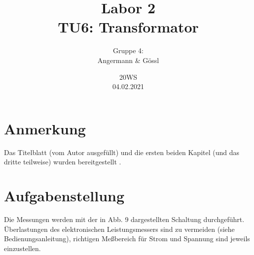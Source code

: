 \documentclass[12pt,a4paper,twoside]{article}
\title{Labor 2 \\ TU6: Transformator}
\author{Gruppe 4: \\ Angermann \& Gössl}
\date{20WS \\ 04.02.2021}
\theoremstyle{definition}
\begin{document}




\tableofcontents
\newpage



\section*{Anmerkung}

Das Titelblatt (vom Autor ausgefüllt) und die ersten beiden Kapitel (und das dritte teilweise) wurden bereitgestellt \cite{teachcenter2}.



\section{Aufgabenstellung}

Die Messungen werden mit der in Abb. 9 dargestellten Schaltung durchgeführt. Überlastungen des elektronischen Leistungsmessers sind zu vermeiden (siehe Bedienungsanleitung), richtigen Meßbereich für Strom und Spannung sind jeweils einzustellen.
\end{document}
